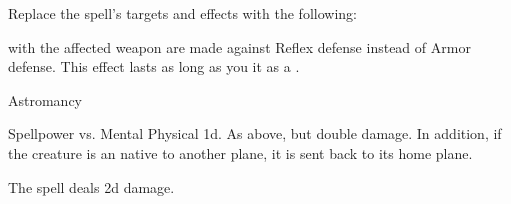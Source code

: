 Replace the spell's targets and effects with the following:
\begin{spellcontent}
\begin{augmenttargetinginfo}
\end{augmenttargetinginfo}
\begin{augmenteffects}
\spelleffect
{} with the affected weapon are made against Reflex defense instead of Armor defense.
This effect lasts as long as you  it as a .
\end{augmenteffects}
\end{spellcontent}
\begin{spellsection}{Astromancy}
\begin{spellheader}
\end{spellheader}
\begin{spellcontent}
\begin{spelltargetinginfo}
\end{spelltargetinginfo}
\begin{spelleffects}
\begin{spellattack}{Spellpower vs. Mental}
\spellsuccess Physical  \plus1d.
\spellcritical
As above, but double damage.
In addition, if the creature is an  native to another plane, it is sent back to its home plane.
\end{spellattack}
\end{spelleffects}
\end{spellcontent}
\begin{spellfooter}
\end{spellfooter}
\begin{spellsubcontent}
\begin{spellcantrip}
The spell deals \minus2d damage.
\end{spellcantrip}
\end{spellsubcontent}
\end{spellsection}

